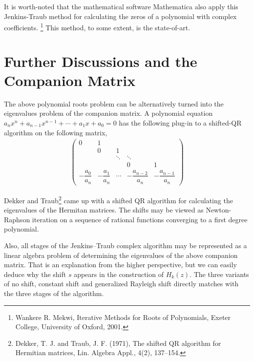 \documentclass[11pt]{article}
\begin{document}
It is worth-noted that the mathematical software Mathematica also apply this Jenkins-Traub method for calculating the zeros of a polynomial with complex coefficients. \footnote{Wankere R. Mekwi, Iterative Methods for Roots of Polynomials, Exeter College, University of Oxford, 2001.} This method, to some extent, is the state-of-art.
\section{Further Discussions and the Companion Matrix}
The above polynomial roots problem can be alternatively turned into the eigenvalues problem of the companion matrix. A polynomial equation $a_nx^n+a_{n-1}x^{n-1}+\cdots+a_1x+a_0=0$ has the following plug-in to a shifted-QR algorithm on the following matrix,
\begin{align*}
	\begin{pmatrix}
		0 & 1 &   &  &\\
		& 0 & 1 &  &\\
		&  &\ddots&\ddots\\
		&  &   &0 &1\\
		-\dfrac{a_0}{a_n} & -\dfrac{a_1}{a_n}  & \cdots & -\dfrac{a_{n-2}}{a_n}&-\dfrac{a_{n-1}}{a_n}
	\end{pmatrix}
\end{align*}

Dekker and Traub\footnote{Dekker, T. J. and Traub, J. F. (1971), The shifted QR algorithm for Hermitian matrices, Lin. Algebra Appl., 4(2), 137–154.} came up with a shifted QR algorithm for calculating the eigenvalues of the Hermitan matrices. The shifts may be viewed as Newton-Raphson iteration on a sequence of rational functions converging to a first degree polynomial. 

Also, all stages of the Jenkins–Traub complex algorithm may be represented as a linear algebra problem of determining the eigenvalues of the above companion  matrix. That is an explanation from the higher perspective, but we can easily deduce why the shift $s$ appears in the construction of $H_k(z)$. The three variants of no shift, constant shift and generalized Rayleigh shift directly matches with the three stages of the algorithm.

\end{document}
